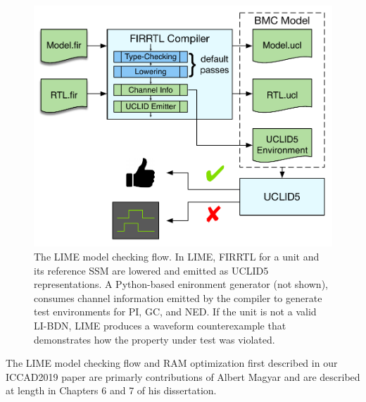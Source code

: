 \begin{figure}
  \centering
    \includegraphics[width=\columnwidth]{figures/lime_flow_small.pdf}
    \caption{The LIME model checking flow. In LIME, FIRRTL for a unit and its
    reference SSM are lowered and emitted as UCLID5 representations. A
    Python-based enironment generator (not shown), consumes channel information
    emitted by the compiler to generate test environments for PI, GC, and NED.
    If the unit is not a valid LI-BDN, LIME produces a waveform counterexample
    that demonstrates how the property under test was violated.
    }
  \label{fig:lime-flow}
\end{figure}


The LIME model checking flow and RAM optimization first described in our
ICCAD2019 paper are primarly contributions of Albert Magyar and are described
at length in Chapters 6 and 7 of his dissertation.

